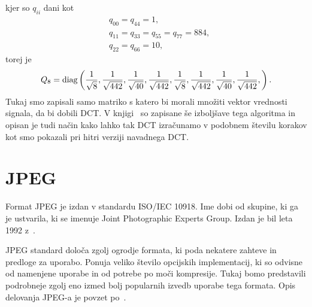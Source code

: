 \documentclass[a4paper,12pt,openright]{book}
\begin{document}
kjer so $q_{ii}$ dani kot
\begin{equation}
  \begin{aligned}
    &q_{00} = q_{44} = 1,\\
    &q_{11} = q_{33} = q_{55} = q_{77} = 884,\\
    &q_{22} = q_{66} = 10,
  \end{aligned}
\end{equation}
torej je
\begin{equation}
    Q_8 = \hbox{diag}\left(\frac{1}{\sqrt{8}}, \frac{1}{\sqrt{442}},\frac{1}{\sqrt{40}},\frac{1}{\sqrt{442}},\frac{1}{\sqrt{8}},\frac{1}{\sqrt{442}},\frac{1}{\sqrt{40}},\frac{1}{\sqrt{442}}, \right).
\end{equation}
Tukaj smo zapisali samo matriko s katero bi morali množiti vektor vrednosti signala, da bi dobili DCT. V knjigi~\cite{britanak2010discrete} so zapisane še izboljšave tega algoritma in opisan je tudi način kako lahko tak DCT izračunamo v podobnem številu korakov kot smo pokazali pri hitri verziji navadnega DCT.






\chapter{JPEG}
\label{JPEG}
Format JPEG je izdan v standardu ISO/IEC 10918. Ime dobi od skupine, ki ga je ustvarila, ki se imenuje Joint Photographic Experts Group. Izdan je bil leta 1992 z~\cite{ISO/IEC_10918-1}.\par
JPEG standard določa zgolj ogrodje formata, ki poda nekatere zahteve in predloge za uporabo. Ponuja veliko število opcijskih implementacij, ki so odvisne od namenjene uporabe in od potrebe po moči kompresije. Tukaj bomo predstavili podrobneje zgolj eno izmed bolj popularnih izvedb uporabe tega formata. Opis delovanja JPEG-a je povzet po~\cite{ISO/IEC_10918-1, wallace1992jpeg}.\par 
\end{document}
